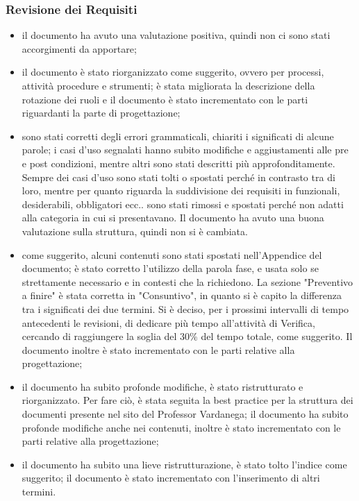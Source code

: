\subsubsection{Revisione dei Requisiti}
\begin{itemize}
\item {} il documento ha avuto una valutazione positiva, quindi non ci sono stati accorgimenti da apportare;
\item {} il documento è stato riorganizzato come suggerito, ovvero per processi, attività procedure e strumenti; è stata migliorata la descrizione della rotazione dei ruoli e il documento è stato incrementato con le parti riguardanti la parte di progettazione;
\item {} sono stati corretti degli errori grammaticali, chiariti i significati di alcune parole; i casi d'uso segnalati hanno subito modifiche e aggiustamenti alle pre e post condizioni, mentre altri sono stati descritti più approfonditamente. Sempre dei casi d'uso sono stati tolti o spostati perché in contrasto tra di loro, mentre per quanto riguarda la suddivisione dei requisiti in funzionali, desiderabili, obbligatori ecc.. sono stati rimossi e spostati perché non adatti alla categoria in cui si presentavano. Il documento ha avuto una buona valutazione sulla struttura, quindi non si è cambiata.
\item {} come suggerito, alcuni contenuti sono stati spostati nell'Appendice del documento; è stato corretto l'utilizzo della parola fase, e usata solo se strettamente necessario e in contesti che la richiedono. La sezione "Preventivo a finire" è stata corretta in "Consuntivo", in quanto si è capito la differenza tra i significati dei due termini. Si è deciso, per i prossimi intervalli di tempo antecedenti le revisioni, di dedicare più tempo all'attività di Verifica, cercando di raggiungere la soglia del 30\% del tempo totale, come suggerito. Il documento inoltre è stato incrementato con le parti relative alla progettazione;
\item {} il documento ha subito profonde modifiche, è stato ristrutturato e riorganizzato. Per fare ciò, è stata seguita la best practice per la struttura dei documenti presente nel sito del Professor Vardanega; il documento ha subito profonde modifiche anche nei contenuti, inoltre è stato incrementato con le parti relative alla progettazione;
\item {} il documento ha subito una lieve ristrutturazione, è stato tolto l'indice come suggerito; il documento è stato incrementato con l'inserimento di altri termini.
\end{itemize}


